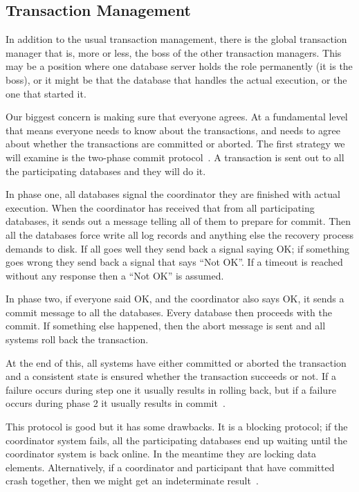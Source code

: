 \subsection*{Transaction Management}

In addition to the usual transaction management, there is the global transaction manager that is, more or less, the boss of the other transaction managers. This may be a position where one database server holds the role permanently (it is the boss), or it might be that the database that handles the actual execution, or the one that started it.

Our biggest concern is making sure that everyone agrees. At a fundamental level that means everyone needs to know about the transactions, and needs to agree about whether the transactions are committed or aborted. The first strategy we will examine is the two-phase commit protocol~\cite{fds}. A transaction is sent out to all the participating databases and they will do it.

In phase one, all databases signal the coordinator they are finished with actual execution. When the coordinator has received that from all participating databases, it sends out a message telling all of them to prepare for commit. Then all the databases force write all log records and anything else the recovery process demands to disk. If all goes well they send back a signal saying OK; if something goes wrong they send back a signal that says ``Not OK''. If a timeout is reached without any response then a ``Not OK'' is assumed.

In phase two, if everyone said OK, and the coordinator also says OK, it sends a commit message to all the databases. Every database then proceeds with the commit. If something else happened, then the abort message is sent and all systems roll back the transaction. 

At the end of this, all systems have either committed or aborted the transaction and a consistent state is ensured whether the transaction succeeds or not. If a failure occurs during step one it usually results in rolling back, but if a failure occurs during phase 2 it usually results in commit~\cite{fds}.

This protocol is good but it has some drawbacks. It is a blocking protocol; if the coordinator system fails, all the participating databases end up waiting until the coordinator system is back online. In the meantime they are locking data elements. Alternatively, if a coordinator and participant that have committed crash together, then we might get an indeterminate result~\cite{fds}.

